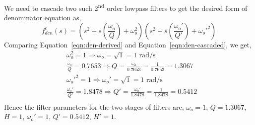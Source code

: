 \documentclass{lab_sheet}
\begin{document}
 We need to cascade two such 2\textsuperscript{nd} order lowpass filters to get the desired form of denominator equation as,
 \begin{equation}
    f_{den}^{c}(s)=\left(s^2+s\left(\frac{\omega_o}{Q}\right)+\omega_o^2\right)\left(s^2+s\left(\frac{\omega_o'}{Q'}\right)+\omega_o'^2\right)
    \label{eqn:den-cascaded}
\end{equation}
Comparing Equation~\ref{eqn:den-derived} and Equation~\ref{eqn:den-cascaded}, we get,
\begin{equation*}
    \begin{aligned}
        &\omega_o^2=1\Rightarrow\omega_o=\sqrt{1}=1 \text{ rad/s}\\
        &\frac{\omega_o}{Q}=0.7653\Rightarrow Q=\frac{\omega_o}{0.7653}=\frac{1}{0.7653}=1.3067\\
        &\omega_o'^2=1\Rightarrow\omega_o'=\sqrt{1}=1\text{ rad/s}\\
        &\frac{\omega_o'}{Q'}=1.8478\Rightarrow Q'=\frac{\omega_o'}{1.8478}=\frac{1}{1.8478}=0.5412\\
    \end{aligned}
\end{equation*}
Hence the filter parameters for the two stages of filters are, $\omega_o=1$, $Q=1.3067$, $H=1$, $\omega_o'=1$, $Q'=0.5412$, $H'=1$.
\end{document}
